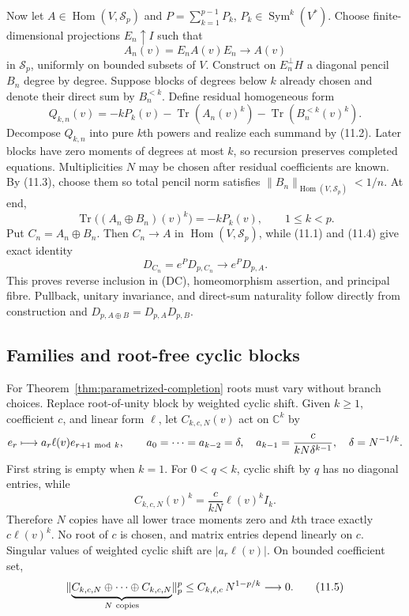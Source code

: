 \documentclass[11pt]{article}
\theoremstyle{definition}
\theoremstyle{remark}
\newcommand{\C}{\mathbb C}
\newcommand{\Tr}{\operatorname{Tr}}
\newcommand{\norm}[1]{\lVert #1\rVert}
\begin{document}
Now let $A\in\operatorname{Hom}(V,\mathcal S_p)$ and
$P=\sum_{k=1}^{p-1}P_k$, $P_k\in\operatorname{Sym}^k(V^*)$.  Choose finite-dimensional
projections $E_n\uparrow I$ such that
\[
 A_n(v)=E_nA(v)E_n\longrightarrow A(v)
\]
in $\mathcal S_p$, uniformly on bounded subsets of $V$.  Construct on $E_n^\perp H$ a diagonal
pencil $B_n$ degree by degree.  Suppose blocks of degrees below $k$ already chosen and denote
their direct sum by $B_n^{<k}$.  Define residual homogeneous form
\[
 Q_{k,n}(v)
 =-kP_k(v)-\Tr(A_n(v)^k)-\Tr(B_n^{<k}(v)^k).
\]
Decompose $Q_{k,n}$ into pure $k$th powers and realize each summand by (11.2).  Later blocks have
zero moments of degrees at most $k$, so recursion preserves completed equations.  Multiplicities
$N$ may be chosen after residual coefficients are known.  By (11.3), choose them so total pencil
norm satisfies $\norm{B_n}_{\operatorname{Hom}(V,\mathcal S_p)}<1/n$.  At end,
\begin{equation}
 \Tr\bigl((A_n\oplus B_n)(v)^k\bigr)=-kP_k(v),
 \qquad 1\leq k<p.                                      \tag{11.4}
\end{equation}
Put $C_n=A_n\oplus B_n$.  Then $C_n\to A$ in
$\operatorname{Hom}(V,\mathcal S_p)$, while (11.1) and (11.4) give exact identity
\[
 D_{C_n}=e^P D_{p,C_n}\longrightarrow e^P D_{p,A}.
\]
This proves reverse inclusion in (DC), homeomorphism assertion, and principal fibre.
Pullback, unitary invariance, and direct-sum naturality follow directly from construction and
$D_{p,A\oplus B}=D_{p,A}D_{p,B}$.

\subsection*{Families and root-free cyclic blocks}

For Theorem~\ref{thm:parametrized-completion} roots must vary without branch choices.  Replace
root-of-unity block by weighted cyclic shift.  Given $k\geq1$, coefficient $c$, and linear form
$\ell$, let $C_{k,c,N}(v)$ act on $\C^k$ by
\[
 e_r\longmapsto a_r\ell(v)e_{r+1\ {\rm mod}\ k},\qquad
 a_0=\cdots=a_{k-2}=\delta,\quad
 a_{k-1}=\frac{c}{kN\delta^{k-1}},\quad
 \delta=N^{-1/k}.
\]
First string is empty when $k=1$.
For $0<q<k$, cyclic shift by $q$ has no diagonal entries, while
\[
 C_{k,c,N}(v)^k=\frac{c}{kN}\ell(v)^kI_k.
\]
Therefore $N$ copies have all lower trace moments zero and $k$th trace exactly
$c\ell(v)^k$.  No root of $c$ is chosen, and matrix entries depend linearly on $c$.  Singular
values of weighted cyclic shift are $|a_r\ell(v)|$.  On bounded coefficient set,
\begin{equation}
 \norm{\underbrace{C_{k,c,N}\oplus\cdots\oplus C_{k,c,N}}_{N\ {\rm copies}}}_p^p
 \leq C_{k,\ell,c}\,N^{1-p/k}\longrightarrow0.            \tag{11.5}
\end{equation}
\end{document}
